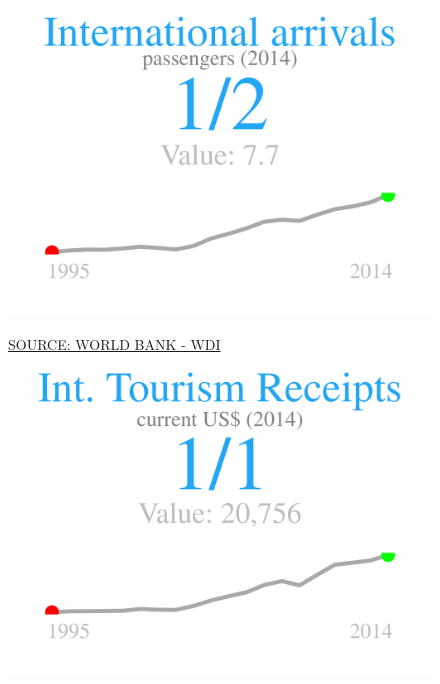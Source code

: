 \documentclass{article}\usepackage[]{graphicx}\usepackage[]{color}
\makeatletter
\def\maxwidth{ %
  \ifdim\Gin@nat@width>\linewidth
    \linewidth
  \else
    \Gin@nat@width
  \fi
}
\makeatother
\begin{document}
\begin{figure}
\begin{minipage}[t]{0.99\textwidth}
\begin{minipage}[t]{0.56\textwidth}
\begin{minipage}[c]{0.30\textwidth}
\hfill{}\includegraphics[width=\maxwidth]{figure/figure_sparkline1-1} 



    \vspace{-2ex}
    \hspace{2ex}\tiny{\href{http://data.worldbank.org/data-catalog/world-development-indicators}{\textcolor[HTML]{FF4023}{SOURCE: WORLD BANK - WDI}}}
    \vspace{3ex}
    \end{minipage}
    \begin{minipage}[c]{0.30\textwidth}


{\centering \includegraphics[width=\maxwidth]{figure/figure_sparkline2-1} 

}




\end{minipage}
\end{minipage}
\end{minipage}
\end{figure}
\end{document}
